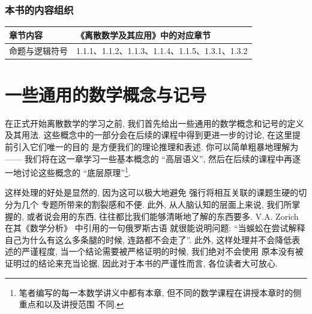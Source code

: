 \documentclass[10pt,UTF8]{book} %
\begin{document}
\subsection*{本书的内容组织}

{
\begin{longtable}{p{}|p{}}
    \toprule
    \textbf{章节内容} & \textbf{《离散数学及其应用》中的对应章节} \\
    \midrule
    \endhead
    \bottomrule
    \endfoot

    命题与逻辑符号 & 1.1.1、1.1.2、1.1.3、1.1.4、1.1.5、1.3.1、1.3.2 \\
\end{longtable}}




\newpage
\thispagestyle{empty}

\pagestyle{plain}
{\small\tableofcontents}
\newpage
\thispagestyle{empty}
\cleardoublepage %


\makeatletter
\let\ps@plain\ps@empty
\makeatother

\mainmatter

\chapter{一些通用的数学概念与记号}

在正式开始离散数学的学习之前, 我们首先给出一些通用的数学概念和记号的定义及其用法.
这些概念中的一部分会在后续的课程中得到更进一步的讨论, 在这里提前引入它们唯一的目的
是方便我们的理论推理和表述. 你可以简单粗暴地理解为 —— 我们将在这一章学习一些基本概念的
“高层语义”, 然后在后续的课程中再逐一地讨论这些概念的 “底层原理”\footnote{
    笔者编写的每一本数学讲义中都有本章, 但不同的数学课程在讲授本章时的侧重点和以及讲授范围
    不同.
}.

这样处理的好处是显然的, 因为这可以极大地避免 {\kaishu 强行将相互关联的课题生硬的切分为几个
专题所带来的割裂感和不便}. 此外, 从人脑认知的层面上来说, 我们所掌握的, 或者说会用的东西,
往往都比我们能够清晰地了解的东西要多. V.A. Zorich 在其《数学分析》\cite{zorich1} 中引用的一句俄罗斯古语
就很能说明问题: {\kaishu “当蜈蚣在尝试解释自己为什么有这么多条腿的时候, 连路都不会走了”}.
此外, 这样处理并不会降低表述的严谨程度, 当一个结论需要被严格证明的时候, 我们绝对不会使用
原本没有被证明过的结论来充当论据, 因此对于本书的严谨性而言, 各位读者大可放心.
\end{document}
